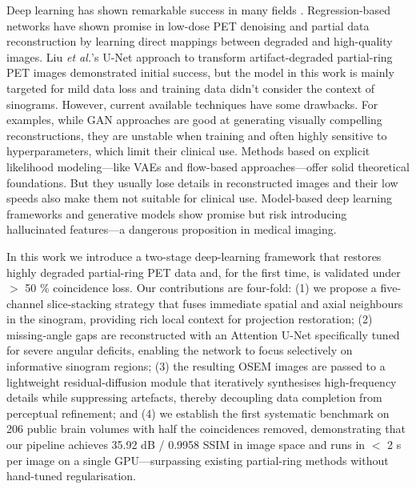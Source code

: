 \documentclass[aps,prb,preprint,groupedaddress,showkeys]{revtex4}
\begin{document}
Deep learning has shown remarkable success in many fields \cite{PhysRevD.110.063011, liu2024deep, reader2020deep}. Regression-based networks have shown promise in low-dose PET denoising and partial data reconstruction \cite{Kandarpa_2021} by learning direct mappings between degraded and high-quality images. Liu \textit{et al.}'s U-Net approach to transform artifact-degraded partial-ring PET images \cite{liu2019} demonstrated initial success, but the model in this work is mainly targeted for mild data loss and training data didn't consider the context of sinograms.
However, current available techniques have some drawbacks.
For examples, while GAN approaches are good at generating visually compelling reconstructions, \cite{xue2023cg3dsrganclassificationguided3d} they are unstable when training and often highly sensitive to hyperparameters, which limit their clinical use.
Methods based on explicit likelihood modeling—like VAEs and flow-based approaches—offer solid theoretical foundations. But they usually lose details in reconstructed images and their low speeds also make them not suitable for clinical use.
Model-based deep learning frameworks and generative models \cite{reader2023, vashistha2024} show promise but risk introducing hallucinated features—a dangerous proposition in medical imaging.

In this work we introduce a two-stage deep-learning framework that restores highly degraded partial-ring PET data and, for the first time, is validated under $>$ 50 \% coincidence loss.  Our contributions are four-fold: 
(1) we propose a five-channel slice-stacking strategy that fuses immediate spatial and axial neighbours in the sinogram, providing rich local context for projection restoration; 
(2) missing‐angle gaps are reconstructed with an Attention U-Net specifically tuned for severe angular deficits, enabling the network to focus selectively on informative sinogram regions; 
(3) the resulting OSEM images are passed to a lightweight residual-diffusion module that iteratively synthesises high-frequency details while suppressing artefacts, thereby decoupling data completion from perceptual refinement; 
and (4) we establish the first systematic benchmark on 206 public brain volumes with half the coincidences removed, demonstrating that our pipeline achieves 35.92 dB / 0.9958 SSIM in image space and runs in $<$ 2 s per image on a single GPU—surpassing existing partial-ring methods without hand-tuned regularisation.
\end{document}
